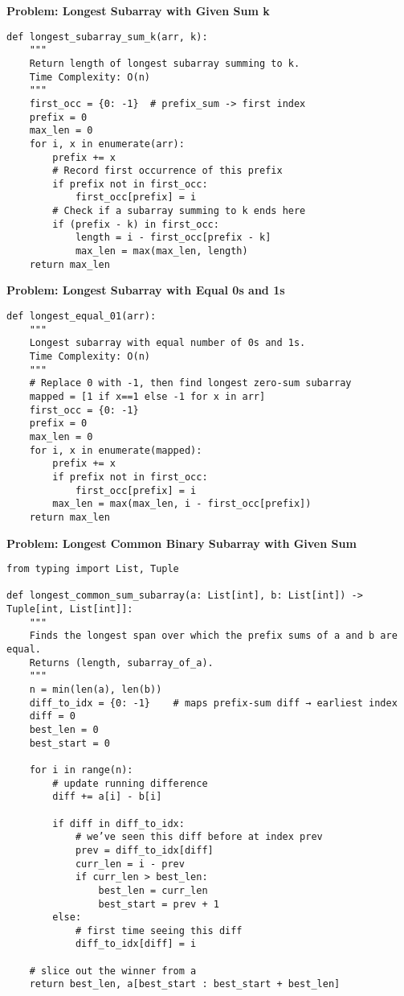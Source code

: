 \noindent\textbf{Problem: Longest Subarray with Given Sum k}
\begin{verbatim}
def longest_subarray_sum_k(arr, k):
    """
    Return length of longest subarray summing to k.
    Time Complexity: O(n)
    """
    first_occ = {0: -1}  # prefix_sum -> first index
    prefix = 0
    max_len = 0
    for i, x in enumerate(arr):
        prefix += x
        # Record first occurrence of this prefix
        if prefix not in first_occ:
            first_occ[prefix] = i
        # Check if a subarray summing to k ends here
        if (prefix - k) in first_occ:
            length = i - first_occ[prefix - k]
            max_len = max(max_len, length)
    return max_len
\end{verbatim}

\noindent\textbf{Problem: Longest Subarray with Equal 0s and 1s}
\begin{verbatim}
def longest_equal_01(arr):
    """
    Longest subarray with equal number of 0s and 1s.
    Time Complexity: O(n)
    """
    # Replace 0 with -1, then find longest zero-sum subarray
    mapped = [1 if x==1 else -1 for x in arr]
    first_occ = {0: -1}
    prefix = 0
    max_len = 0
    for i, x in enumerate(mapped):
        prefix += x
        if prefix not in first_occ:
            first_occ[prefix] = i
        max_len = max(max_len, i - first_occ[prefix])
    return max_len
\end{verbatim}

\noindent\textbf{Problem: Longest Common Binary Subarray with Given Sum}
\begin{verbatim}
from typing import List, Tuple

def longest_common_sum_subarray(a: List[int], b: List[int]) -> Tuple[int, List[int]]:
    """
    Finds the longest span over which the prefix sums of a and b are equal.
    Returns (length, subarray_of_a).
    """
    n = min(len(a), len(b))
    diff_to_idx = {0: -1}    # maps prefix‐sum diff → earliest index
    diff = 0
    best_len = 0
    best_start = 0

    for i in range(n):
        # update running difference
        diff += a[i] - b[i]

        if diff in diff_to_idx:
            # we’ve seen this diff before at index prev
            prev = diff_to_idx[diff]
            curr_len = i - prev
            if curr_len > best_len:
                best_len = curr_len
                best_start = prev + 1
        else:
            # first time seeing this diff
            diff_to_idx[diff] = i

    # slice out the winner from a
    return best_len, a[best_start : best_start + best_len]

\end{verbatim}

